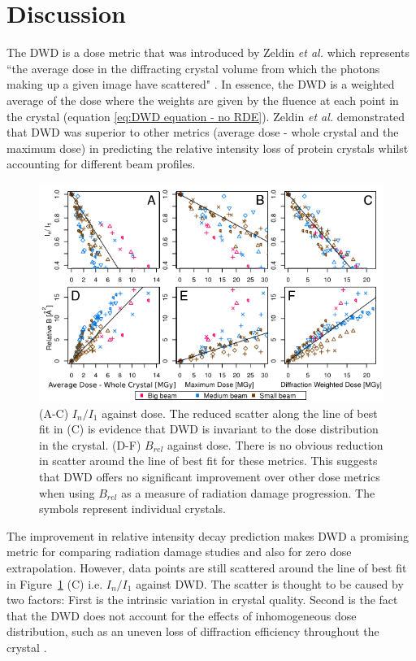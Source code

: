 \section{Discussion}
\label{sec:Discussion - Dose Decay Modelling}
The DWD is a dose metric that was introduced by Zeldin \textit{et al.} which represents ``the average dose in the diffracting crystal volume from which the photons making up a given image have scattered" \cite{zeldin2013dwd}.
In essence, the DWD is a weighted average of the dose where the weights are given by the fluence at each point in the crystal (equation \ref{eq:DWD equation - no RDE}).
Zeldin \textit{et al.} demonstrated that DWD was superior to other metrics (average dose - whole crystal and the maximum dose) in predicting the relative intensity loss of protein crystals whilst accounting for different beam profiles.
\begin{figure}
  \centering
    \includegraphics[width=1\textwidth]{figures/dwd/zeldin_metric_comparisons.png}
    \caption{(A-C) $I_n/I_1$ against dose. The reduced scatter along the line of best fit in (C) is evidence that DWD is invariant to the dose distribution in the crystal. (D-F) $B_{rel}$ against dose. There is no obvious reduction in scatter around the line of best fit for these metrics. This suggests that DWD offers no significant improvement over other dose metrics when using $B_{rel}$ as a measure of radiation damage progression. The symbols represent individual crystals.}
    \label{fig:Dose metric comparisons - zeldin et al}
\end{figure}
The improvement in relative intensity decay prediction makes DWD a promising metric for comparing radiation damage studies and also for zero dose extrapolation.
However, data points are still scattered around the line of best fit in Figure~\ref{fig:Dose metric comparisons - zeldin et al} (C) i.e. $I_n/I_1$ against DWD.
The scatter is thought to be caused by two factors:
First is the intrinsic variation in crystal quality.
Second is the fact that the DWD does not account for the effects of inhomogeneous dose distribution, such as an uneven loss of diffraction efficiency throughout the crystal \cite{zeldin2013dwd}.

